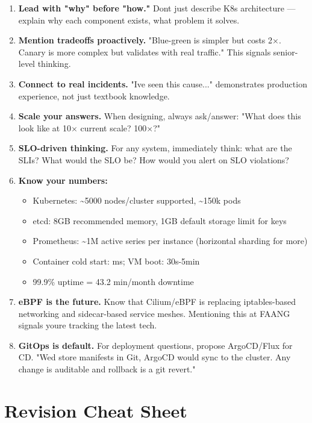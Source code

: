 \documentclass[11pt]{article}
\providecommand{\tightlist}{\setlength{\itemsep}{1pt}\setlength{\parskip}{0pt}}
\begin{document}
\begin{enumerate}
\def\labelenumi{\arabic{enumi}.}
\item
  \textbf{Lead with "why" before "how."} Don\textquotesingle t just describe K8s architecture --- explain why each component exists, what problem it solves.
\item
  \textbf{Mention tradeoffs proactively.} "Blue-green is simpler but costs 2\(\times\). Canary is more complex but validates with real traffic." This signals senior-level thinking.
\item
  \textbf{Connect to real incidents.} "I\textquotesingle ve seen this cause..." demonstrates production experience, not just textbook knowledge.
\item
  \textbf{Scale your answers.} When designing, always ask/answer: "What does this look like at 10\(\times\) current scale? 100\(\times\)?"
\item
  \textbf{SLO-driven thinking.} For any system, immediately think: what are the SLIs? What would the SLO be? How would you alert on SLO violations?
\item
  \textbf{Know your numbers:}

  \begin{itemize}
  \tightlist
  \item
    Kubernetes: \textasciitilde5000 nodes/cluster supported, \textasciitilde150k pods
  \item
    etcd: 8GB recommended memory, 1GB default storage limit for keys
  \item
    Prometheus: \textasciitilde1M active series per instance (horizontal sharding for more)
  \item
    Container cold start: ms; VM boot: 30s-5min
  \item
    99.9\% uptime = 43.2 min/month downtime
  \end{itemize}
\item
  \textbf{eBPF is the future.} Know that Cilium/eBPF is replacing iptables-based networking and sidecar-based service meshes. Mentioning this at FAANG signals you\textquotesingle re tracking the latest tech.
\item
  \textbf{GitOps is default.} For deployment questions, propose ArgoCD/Flux for CD. "We\textquotesingle d store manifests in Git, ArgoCD would sync to the cluster. Any change is auditable and rollback is a git revert."
\end{enumerate}

\section{Revision Cheat Sheet}\label{revision-cheat-sheet}
\end{document}
